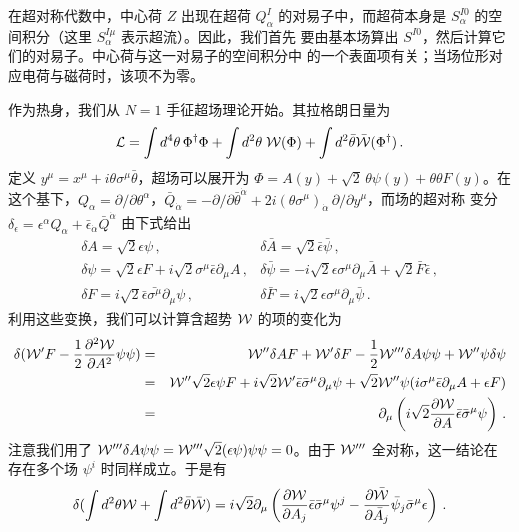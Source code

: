 在超对称代数中，中心荷 $Z$ 出现在超荷 $Q^I_\alpha$ 的对易子中，而超荷本身是
$S^{I0}_\alpha$ 的空间积分（这里 $S^{I\mu}_\alpha$ 表示超流）。因此，我们首先
要由基本场算出 $S^{I0}$，然后计算它们的对易子。中心荷与这一对易子的空间积分中
的一个表面项有关；当场位形对应电荷与磁荷时，该项不为零。
  
作为热身，我们从 $N=1$ 手征超场理论开始。其拉格朗日量为
$$
{\cal L}=\int d^4 \theta\,\Phi^\dagger\Phi +\int d^2 \theta \;
{\cal W}(\Phi) + \int d^2 \bar\theta \bar{\cal W}(\Phi^\dagger)\,.
$$
定义 $y^\mu=x^\mu + i \theta \sigma^\mu \bar{\theta}$，超场可以展开为
$\Phi=A(y)+\sqrt{2}\,\theta\psi(y)
+\theta\theta F(y)$。在这个基下，$Q_{\alpha}=\partial /
\partial\theta^{\alpha}$，$\bar{Q}_{\dot{\alpha}}=-
\partial/\partial\bar{\theta}^{\dot{\alpha}} + 2i
(\theta \sigma^\mu)_{\dot{\alpha}}\,\partial/\partial y^\mu$，而场的超对称
变分 $\delta_{\epsilon}=\epsilon^\alpha Q_\alpha +
\bar{\epsilon}_{\dot{\alpha}} \bar{Q}^{\dot{\alpha}}$ 由下式给出
$$
\begin{array}{ll}
\delta A=\sqrt{2} \epsilon \psi\,,&
\delta\bar A=\sqrt{2} \bar{\epsilon}\bar{\psi}\,, \\
\delta\psi=\sqrt{2}\epsilon F + i\sqrt{2}\sigma^\mu
\bar{\epsilon} \partial_\mu A\,, &
\delta\bar{\psi}=-i\sqrt{2}\epsilon\sigma^\mu
\partial_\mu \bar{A}+\sqrt{2} \bar{F} \bar{\epsilon}\,, \\
\delta F=i\sqrt{2} \bar{\epsilon}\bar{\sigma^\mu}
\partial_\mu \psi\,, & \delta \bar{F}=i\sqrt{2}\epsilon 
\sigma^\mu \partial_\mu \bar{\psi}\,.
\end{array}
$$
利用这些变换，我们可以计算含超势 ${\cal W}$ 的项的变化为
\begin{eqnarray}
\delta ({\cal W}'F - \frac{1}{2} \frac{\partial^2 {\cal W}}{\partial
  A^2}\psi\psi) 
&=& {\cal W}''\delta AF+{\cal W}'\delta F-\frac{1}{2}{\cal W}'''\delta
A\psi\psi+{\cal W}'' \psi \delta \psi \nonumber\\
&=& {\cal W}''\sqrt{2}\epsilon\psi F+i\sqrt{2}{\cal W}'\bar{\epsilon}
\bar{\sigma}^\mu \partial_\mu \psi+\sqrt{2}{\cal W}''\psi(i\sigma^\mu 
\bar{\epsilon}\partial_\mu A + \epsilon F) \nonumber\\
&=&\partial_\mu \left( i \sqrt{2} \frac{\partial {\cal W}}{\partial A}
\bar{\epsilon} \bar{\sigma}^\mu \psi \right )\,.\nonumber
\end{eqnarray}
注意我们用了 ${\cal W}'''\delta A\psi\psi={\cal W}'''
\sqrt{2}(\epsilon \psi)\psi\psi=0$。由于 ${\cal W}'''$ 全对称，这一结论在
存在多个场 $\psi^i$ 时同样成立。于是有
$$
\delta (\int d^{2} \theta {\cal W} + \int d^{2} \bar{\theta}
\bar{{\cal W}})=i\sqrt{2}\partial_\mu\left(\frac{\partial {\cal W}}
{\partial A_j} \bar{\epsilon}\bar{\sigma}^\mu \psi^{j} -
\frac{\partial \bar{{\cal W}}}{\partial \bar{A}_j} \bar{\psi}_{j}
\bar{\sigma}^\mu \epsilon \right)\,.
$$
